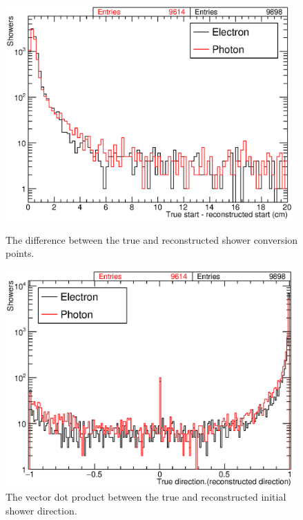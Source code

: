 \begin{figure}
  \begin{minipage}[t]{0.48\linewidth}
    \centering
    \includegraphics[width=0.98\textwidth]{ShowerStart.eps}
    \caption[The difference between the true and reconstructed shower conversion points.]{The difference between the true and reconstructed shower conversion points.}
    \label{fig:ShowerStart}
  \end{minipage}
  \hfill
  \begin{minipage}[t]{0.48\linewidth}
    \centering
    \includegraphics[width=0.98\textwidth]{ShowerDirection.eps}
    \caption[The vector dot product between the true and reconstructed initial shower direction.]{The vector dot product between the true and reconstructed initial shower direction.}
    \label{fig:ShowerDirection}
  \end{minipage}
\end{figure}

